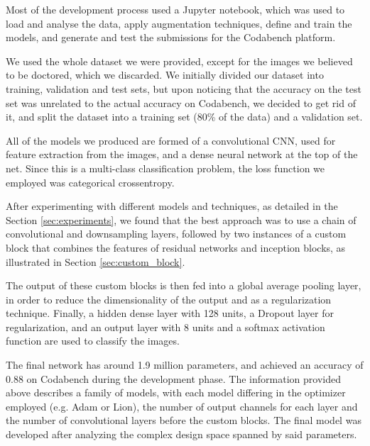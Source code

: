 \documentclass[11pt]{article}
\begin{document}
\begin{multicols}{2}


      Most of the development process used a Jupyter notebook, which was used to load and
      analyse the data, apply augmentation techniques, define and train the models, and
      generate and test the submissions for the Codabench platform.

      We used the whole dataset we were provided, except for the images we believed to be
      doctored, which we discarded. We initially divided our dataset into training, validation
      and test sets, but upon noticing that the accuracy on the test set was unrelated to the
      actual accuracy on Codabench, we decided to get rid of it, and split the dataset into a 
      training set (80\% of the data) and a validation set.

      All of the models we produced are formed of a convolutional CNN, used for feature extraction 
      from the images, and a dense neural network at the top of the net. Since this is a multi-class
      classification problem, the loss function we employed was categorical crossentropy.

      After experimenting with different models and techniques, as detailed in
      the Section \ref{sec:experiments}, we found that the best approach was to 
      use a chain of convolutional and downsampling layers, followed by two instances
      of a custom block that combines the features of residual networks and inception 
      blocks, as illustrated in Section \ref{sec:custom_block}.

      The output of these custom blocks is then fed into a global average
      pooling layer, in order to reduce the dimensionality of the output and as a regularization technique. 
      Finally, a hidden dense layer with 128 units, a Dropout layer for regularization, and an output layer 
      with 8 units and a softmax activation function are used to classify the images.

      The final network has around 1.9 million parameters, and achieved an accuracy of 0.88 on Codabench
      during the development phase. The information provided above describes a family of models, with
      each model differing in the optimizer employed (e.g. Adam or Lion), the number of output channels
      for each layer and the number of convolutional layers before the custom blocks. The final model 
      was developed after analyzing the complex design space spanned by said parameters.


\end{multicols}
\end{document}
